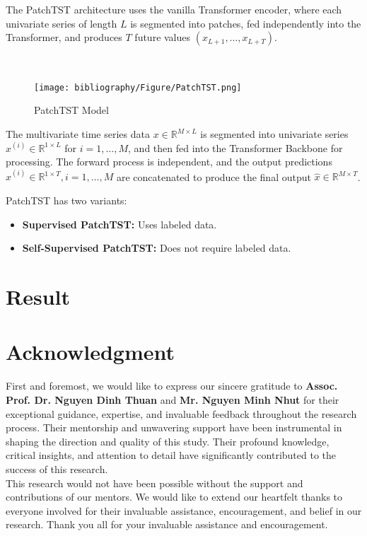 \documentclass{ieeeojies}
\begin{document}
The PatchTST architecture uses the vanilla Transformer encoder, where each univariate series of length \( L \) is segmented into patches, fed independently into the Transformer, and produces \( T \) future values \( (x_{L+1}, \ldots, x_{L+T}) \).

\ 
\\
\begin{figure}[H]
    \centering
    \texttt{[image: bibliography/Figure/PatchTST.png]}
    \caption{PatchTST Model}
    \label{fig:PatchTST_Model}
\end{figure}
The multivariate time series data \( x \in \mathbb{R}^{M \times L} \) is segmented into univariate series \( x^{(i)} \in \mathbb{R}^{1 \times L} \) for \( i = 1, \ldots, M \), and then fed into the Transformer Backbone for processing. The forward process is independent, and the output predictions \( \hat{x}^{(i)} \in \mathbb{R}^{1 \times T}, i = 1, \ldots, M \) are concatenated to produce the final output \( \hat{x} \in \mathbb{R}^{M \times T} \).

PatchTST has two variants:
\begin{itemize}
    \item \textbf{Supervised PatchTST:} Uses labeled data.
    \item \textbf{Self-Supervised PatchTST:} Does not require labeled data.
\end{itemize}
\section{Result}


\section*{Acknowledgment}
First and foremost, we would like to express our sincere gratitude to \textbf{Assoc. Prof. Dr. Nguyen Dinh Thuan} and \textbf{Mr. Nguyen Minh Nhut} for their exceptional guidance, expertise, and invaluable feedback throughout the research process. Their mentorship and unwavering support have been instrumental in shaping the direction and quality of this study. Their profound knowledge, critical insights, and attention to detail have significantly contributed to the success of this research.
\\This research would not have been possible without the support and contributions of our mentors. We would like to extend our heartfelt thanks to everyone involved for their invaluable assistance, encouragement, and belief in our research. Thank you all for your invaluable assistance and encouragement.
\end{document}
